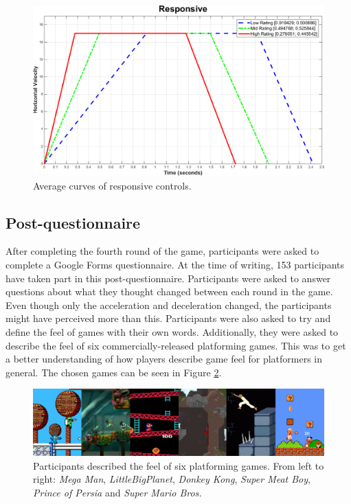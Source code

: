 \begin{figure}[htbp]
\centering
\includegraphics[width=0.9\columnwidth]{Pics/Curves/Responsive_curve}
\caption{Average curves of responsive controls.}
\label{fig:curve_responsive}
\end{figure}

\subsection{Post-questionnaire}
After completing the fourth round of the game, participants were asked to complete a Google Forms questionnaire. At the time of writing, 153 participants have taken part in this post-questionnaire. Participants were asked to answer questions about what they thought changed between each round in the game. Even though only the acceleration and deceleration changed, the participants might have perceived more than this. Participants were also asked to try and define the feel of games with their own words. Additionally, they were asked to describe the feel of six commercially-released platforming games. This was to get a better understanding of how players describe game feel for platformers in general. The chosen games can be seen in Figure \ref{fig:rate_games_all}.

\begin{figure}[htbp]
\centering
\includegraphics[width=1\textwidth]{Pics/rate_games_all}
\caption{Participants described the feel of six platforming games. From left to right: \textit{Mega Man}, \textit{LittleBigPlanet}, \textit{Donkey Kong}, \textit{Super Meat Boy}, \textit{Prince of Persia} and \textit{Super Mario Bros.}}
\label{fig:rate_games_all}
\end{figure}

